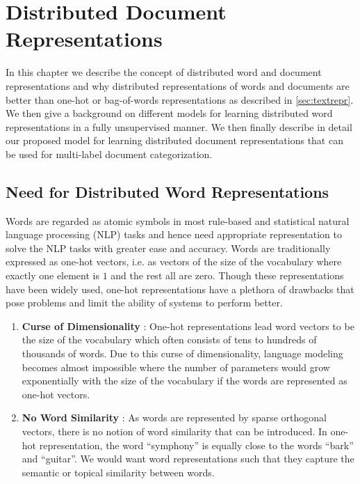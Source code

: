 \chapter{Distributed Document Representations}
\label{chapter:distembed}
In this chapter we describe the concept of distributed word and document representations and why distributed representations of words and documents are better than one-hot or bag-of-words representations as described in \ref{sec:textrepr}. We then give a background on different models for learning distributed word representations in a fully unsupervised manner. We then finally describe in detail our proposed model for learning distributed document representations that can be used for multi-label document categorization.

\section{Need for Distributed Word Representations}
\label{sec:motivation_distributed}
Words are regarded as atomic symbols in most rule-based and statistical natural language processing (NLP) tasks and hence need appropriate representation to solve the NLP tasks with greater ease and accuracy. 
Words are traditionally expressed as one-hot vectors, i.e. as vectors of the size of the vocabulary where exactly one element is $1$ and the rest all are zero.
Though these representations have been widely used, one-hot representations have a plethora of drawbacks that pose problems and limit the ability of systems to perform better. 
\begin{enumerate}
\item \textbf{Curse of Dimensionality} : One-hot representations lead word vectors to be the size of the vocabulary which often consists of tens to hundreds of thousands of words. Due to this curse of dimensionality, language modeling becomes almost impossible where the number of parameters would grow exponentially with the size of the vocabulary if the words are represented as one-hot vectors.

\item \textbf{No Word Similarity} : As words are represented by sparse orthogonal vectors, there is no notion of word similarity that can be introduced. In one-hot representation, the word ``symphony'' is equally close to the words ``bark'' and ``guitar''. We would want word representations such that they capture the semantic or topical similarity between words.
\end{enumerate}

